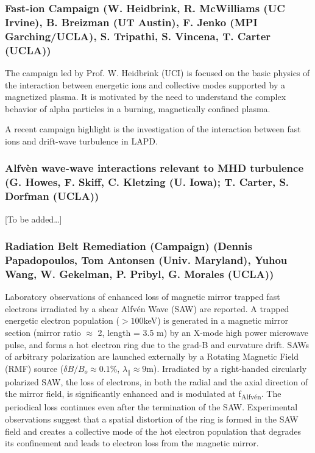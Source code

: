 \documentclass[11pt]{article}
\begin{document}
\subsubsection{Fast-ion Campaign (W. Heidbrink, R. McWilliams (UC Irvine), B.
Breizman (UT Austin), F. Jenko (MPI Garching/UCLA), S. Tripathi, S.
Vincena, T. Carter (UCLA))}

The campaign led by Prof. W. Heidbrink (UCI) is focused on the basic
physics of the interaction between energetic ions and collective modes
supported by a magnetized plasma. It is motivated by the need to
understand the complex behavior of alpha particles in a burning,
magnetically confined plasma.

A recent campaign highlight is the investigation of the interaction
between fast ions and drift-wave turbulence in LAPD. 

\subsubsection{Alfvèn wave-wave interactions relevant to MHD turbulence (G.
Howes, F. Skiff, C. Kletzing (U. Iowa); T. Carter, S. Dorfman (UCLA))}

{[}To be added\ldots{}{]}

\subsubsection{Radiation Belt Remediation (Campaign) (Dennis Papadopoulos, Tom
Antonsen (Univ. Maryland), Yuhou Wang, W. Gekelman, P. Pribyl, G.
Morales (UCLA))}

Laboratory observations of enhanced loss of magnetic mirror trapped fast
electrons irradiated by a shear Alfv\'{e}n Wave (SAW) are reported. A
trapped energetic electron population ($> 100$keV) is
generated in a magnetic mirror section (mirror ratio $\approx$ 2,
length = 3.5
m) by an X-mode high power microwave pulse, and forms a hot electron
ring due to the grad-B and curvature drift. SAWs of arbitrary
polarization are launched externally by a Rotating Magnetic Field (RMF)
source ($\delta B/B_o \approx 0.1$\%, $\lambda_\parallel \approx 9$m).
Irradiated by a right-handed circularly polarized SAW, the loss of
electrons, in both the radial and the axial direction of the mirror
field, is significantly enhanced and is modulated at
f\textsubscript{Alfv\'{e}n}. The periodical loss continues even after the
termination of the SAW. Experimental observations suggest that a spatial
distortion of the ring is formed in the SAW field and creates a
collective mode of the hot electron population that degrades its
confinement and leads to electron loss from the magnetic mirror.
\end{document}
